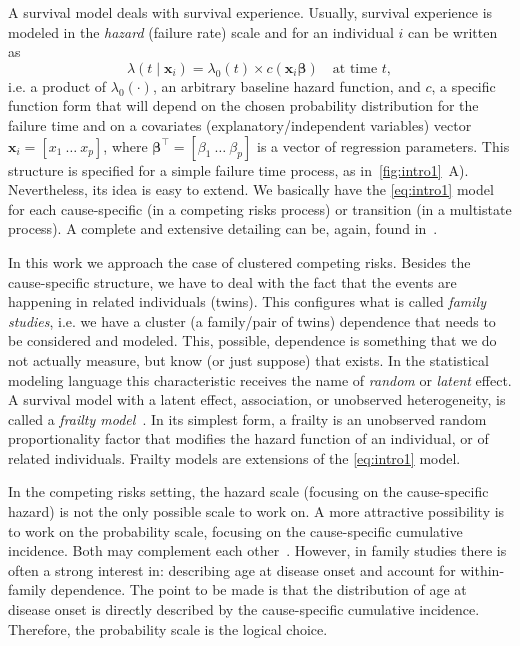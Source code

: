 A survival model deals with survival experience. Usually, survival
experience is modeled in the \textit{hazard} (failure rate) scale and
for an individual \(i\) can be written as
\begin{equation}
  \lambda(t \mid \bm{x}_{i}) =
  \lambda_{0}(t) \times c(\bm{x}_{i} \bm{\beta})
  \quad \text{at time } t,
  \label{eq:intro1}
\end{equation}
i.e. a product of \(\lambda_{0}(\cdot)\), an arbitrary baseline hazard
function, and \(c\), a specific function form that will depend on the
chosen probability distribution for the failure time and on a covariates
(explanatory/independent variables) vector \(\bm{x}_{i} =
[x_{1}~\dots~x_{p}]\), where \(\bm{\beta}^{\top} =
[\beta_{1}~\dots~\beta_{p}]\) is a vector of regression parameters. This
structure is specified for a simple failure time process, as
in~\autoref{fig:intro1}~A). Nevertheless, its idea is easy to extend. We
basically have the \autoref{eq:intro1} model for each cause-specific (in
a competing risks process) or transition (in a multistate process). A
complete and extensive detailing can be, again, found
in~.

In this work we approach the case of clustered competing risks. Besides
the cause-specific structure, we have to deal with the fact that the
events are happening in related individuals (twins). This configures
what is called \textit{family studies}, i.e. we have a cluster (a
family/pair of twins) dependence that needs to be considered and
modeled. This, possible, dependence is something that we do not actually
measure, but know (or just suppose) that exists. In the statistical
modeling language this characteristic receives the name of
\textit{random} or \textit{latent} effect. A survival model with a
latent effect, association, or unobserved heterogeneity, is called a
\textit{frailty model}~\cite{frailty78, frailty79}. In its simplest
form, a frailty is an unobserved random proportionality factor that
modifies the hazard function of an individual, or of related
individuals. Frailty models are extensions of the \autoref{eq:intro1}
model.

In the competing risks setting, the hazard scale (focusing on the
cause-specific hazard) is not the only possible scale to work on. A more
attractive possibility is to work on the probability scale, focusing on
the cause-specific cumulative incidence. Both may complement each
other~\cite{andersen12}. However, in family studies there is often a
strong interest in: describing age at disease onset and account for
within-family dependence. The point to be made is that the distribution
of age at disease onset is directly described by the cause-specific
cumulative incidence. Therefore, the probability scale is the logical
choice.

